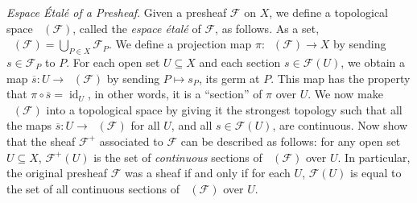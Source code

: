 \documentclass[10pt]{article}
\theoremstyle{definition}
\theoremstyle{remark}
\numberwithin{equation}{section}
\numberwithin{figure}{subsubsection}
\DeclareMathOperator{\id}{id}
\DeclareMathOperator{\Spe}{Sp\acute{e}}
\begin{document}
\begin{problem}
  \emph{Espace \'Etal\'e of a Presheaf}. Given a presheaf $\mathscr{F}$ on $X$, we define a topological space $\Spe(\mathscr{F})$, called the \emph{espace \'etal\'e} of $\mathscr{F}$, as follows. As a set, $\Spe(\mathscr{F}) = \bigcup_{P\in X} \mathscr{F}_P$. We define a projection map $\pi\colon\Spe(\mathscr{F}) \to X$ by sending $s \in \mathscr{F}_P$ to $P$. For each open set $U \subseteq X$ and each section $s \in \mathscr{F}(U)$, we obtain a map $\overline{s}\colon U \to \Spe(\mathscr{F})$ by sending $P \mapsto s_P$, its germ at $P$. This map has the property that $\pi \circ \overline{s} = \id_U$, in other words, it is a ``section'' of $\pi$ over $U$. We now make $\Spe(\mathscr{F})$ into a topological space by giving it the strongest topology such that all the maps $\overline{s}\colon U \to \Spe(\mathscr{F})$ for all $U$, and all $s \in \mathscr{F}(U)$, are continuous. Now show that the sheaf $\mathscr{F}^+$ associated to $\mathscr{F}$ can be described as follows: for any open set $U \subseteq X$, $\mathscr{F}^+(U)$ is the set of \emph{continuous} sections of $\Spe(\mathscr{F})$ over $U$. In particular, the original presheaf $\mathscr{F}$ was a sheaf if and only if for each $U$, $\mathscr{F}(U)$ is equal to the set of all continuous sections of $\Spe(\mathscr{F})$ over $U$.
\end{problem}
\end{document}
